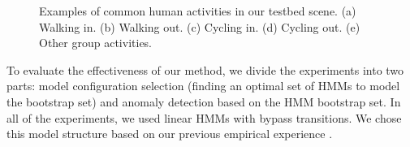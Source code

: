 \begin{figure}[t]
  \centering
  \hspace{0.03in}
  \hspace{0.03in}
  \hspace{0.03in}
  \hspace{0.03in}
  \caption[Examples of common human activities in our testbed
    scene.]{\small Examples of common human activities in our testbed scene.
    (a) Walking in. (b) Walking out. (c) Cycling in. (d) Cycling out. 
    (e) Other group activities.}
  \label{fig:batch-example-behavior}
\end{figure}

To evaluate the effectiveness of our method, we divide the experiments
into two parts: model configuration selection (finding an optimal set
of HMMs to model the bootstrap set) and anomaly detection based on the
HMM bootstrap set. In all of the experiments, we used linear HMMs with 
bypass transitions. We chose this model structure based on our 
previous empirical experience .

